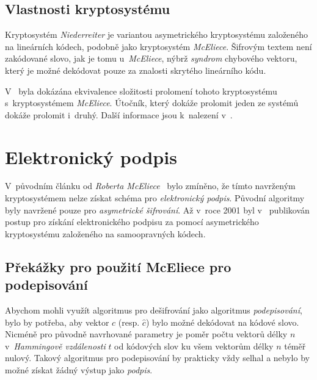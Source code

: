 \documentclass[thesis=M,czech,hidelinks]{FITthesis}[2012/06/26]
\newcommand{\0}{{\textcolor[gray]{0.75}{0}}}
\begin{document}
\subsection{Vlastnosti kryptosystému}

Kryptosystém \emph{Niederreiter} je variantou asymetrického kryptosystému
založeného na lineárních kódech, podobně jako kryptosystém \emph{McEliece}.
Šifrovým textem není zakódované slovo, jak je tomu u~\emph{McEliece}, nýbrž
\emph{syndrom} chybového vektoru, který je možné dekódovat pouze za znalosti
skrytého lineárního kódu.

V~\cite{XingLi} byla dokázána ekvivalence složitosti prolomení tohoto
kryptosystému s~kryptosystémem \emph{McEliece}. Útočník, který dokáže prolomit
jeden ze systémů dokáže prolomit i~druhý. Další informace jsou k~nalezení
v~\cite{Niederreiter,Courtois}.



\section{Elektronický podpis}\label{kap_podpis}

V~původním článku od \emph{Roberta McEliece}~\cite{McEliece} bylo zmíněno, že
tímto navrženým kryptosystémem nelze získat schéma pro \emph{elektronický
podpis}.  Původní algoritmy byly navržené pouze pro \emph{asymetrické
šifrování}. Až v~roce 2001 byl v~\cite{Courtois} publikován postup pro získání
elektronického podpisu za pomocí asymetrického kryptosystému založeného na
samoopravných kódech.

\subsection{Překážky pro použití McEliece pro podepisování}

Abychom mohli využít algoritmus pro dešifrování jako algoritmus
\emph{podepisování}, bylo by potřeba, aby vektor $c$ (resp. $\hat{c}$) bylo
možné dekódovat na kódové slovo. Nicméně pro původně navrhované parametry je
poměr počtu vektorů délky $n$ v~\emph{Hammingově vzdálenosti} $t$ od kódových
slov ku všem vektorům délky $n$ téměř nulový. Takový algoritmus pro podepisování
by prakticky vždy selhal a nebylo by možné získat žádný výstup jako
\emph{podpis}.
\end{document}
